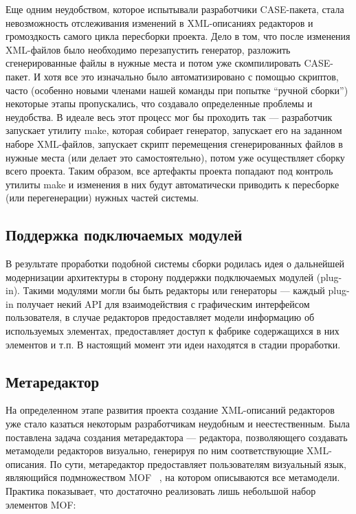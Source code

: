 \documentclass[a5paper]{article}
\begin{document}
Еще одним неудобством, которое испытывали разработчики CASE-пакета,
стала невозможность отслеживания изменений в XML-описаниях редакторов и
громоздкость самого цикла пересборки проекта. Дело в том, что после
изменения XML-файлов было необходимо перезапустить генератор, разложить
сгенерированные файлы в нужные места и потом уже скомпилировать
CASE-пакет. И хотя все это изначально было автоматизировано с помощью
скриптов, часто (особенно новыми членами нашей команды при попытке
``ручной сборки'') некоторые этапы пропускались, что создавало
определенные проблемы и неудобства. В идеале весь этот процесс мог бы
проходить так --- разработчик запускает утилиту make, которая собирает
генератор, запускает его на заданном наборе XML-файлов, запускает
скрипт перемещения сгенерированных файлов в нужные места (или делает
это самостоятельно), потом уже осуществляет сборку всего проекта. Таким
образом, все артефакты проекта попадают под контроль утилиты make и
изменения в них будут автоматически приводить к пересборке (или
перегенерации) нужных частей системы.

\subsection{Поддержка подключаемых модулей}

В результате проработки подобной системы сборки родилась идея о
дальнейшей модернизации архитектуры в сторону поддержки подключаемых
модулей (plug-in). Такими модулями могли бы быть редакторы или
генераторы --- каждый plug-in получает некий API для взаимодействия с
графическим интерфейсом пользователя, в случае редакторов предоставляет
модели информацию об используемых элементах, предоставляет доступ к
фабрике содержащихся в них элементов и т.п. В настоящий момент эти идеи
находятся в стадии проработки.

\subsection{Метаредактор}

На определенном этапе развития проекта создание XML-описаний редакторов
уже стало казаться некоторым разработчикам неудобным и неестественным.
Была поставлена задача создания метаредактора --- редактора, позволяющего
создавать метамодели редакторов визуально, генерируя по ним
соответствующие XML-описания. По сути, метаредактор предоставляет
пользователям визуальный язык, являющийся подмножеством
MOF~\cite{mof} , на котором описываются все
метамодели. Практика показывает, что достаточно реализовать лишь
небольшой набор элементов MOF: 
\end{document}

